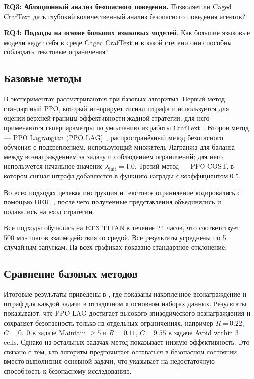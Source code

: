 \textbf{RQ3: Абляционный анализ безопасного поведения.} Позволяет ли Caged CrafText дать глубокий количественный анализ безопасного поведения агентов?

\textbf{RQ4: Подходы на основе больших языковых моделей.} Как большие языковые модели ведут себя в среде Caged CrafText и в какой степени они способны соблюдать текстовые ограничения?

\subsection{Базовые методы}

В экспериментах рассматриваются три базовых алгоритма. Первый метод --- стандартный PPO, который игнорирует сигнал штрафа и используется для оценки верхней границы эффективности жадной стратегии; для него применяются гиперпараметры по умолчанию из работы CrafText~\cite{volovikova2025craftext}. Второй метод --- PPO Lagrangian (PPO LAG)~\cite{stooke2020pidlag}, распространённый метод безопасного обучения с подкреплением, использующий множитель Лагранжа для баланса между вознаграждением за задачу и соблюдением ограничений; для него используется начальное значение $\lambda_{\text{init}}=1.0$. Третий метод --- PPO COST, в котором сигнал штрафа добавляется в функцию награды с коэффициентом $0.5$.

Во всех подходах целевая инструкция и текстовое ограничение кодировались с помощью BERT, после чего полученные представления объединялись и подавались на вход стратегии.

Все подходы обучались на RTX TITAN в течение 24 часов, что соответствует 500 млн шагов взаимодействия со средой. Все результаты усреднены по 5 случайным запускам. На всех графиках показано стандартное отклонение.

\subsection{Сравнение базовых методов}
\label{sec:craftext_rq1}

Итоговые результаты приведены в , где показаны накопленное вознаграждение и штраф для каждой задачи в отладочном и основном наборах данных. Результаты показывают, что PPO-LAG достигает высокого эпизодического вознаграждения и сохраняет безопасность только на отдельных ограничениях, например $R=0.22$, $C=0.10$ в задаче Maintain  $\geq 5$ и $R=0.11$, $C=9.55$ в задаче Avoid  within 3 cells. Однако на остальных задачах метод показывает низкую эффективность. Это связано с тем, что алгоритм предпочитает оставаться в безопасном состоянии вместо выполнения основной задачи, что указывает на недостаточную способность к безопасному исследованию.

